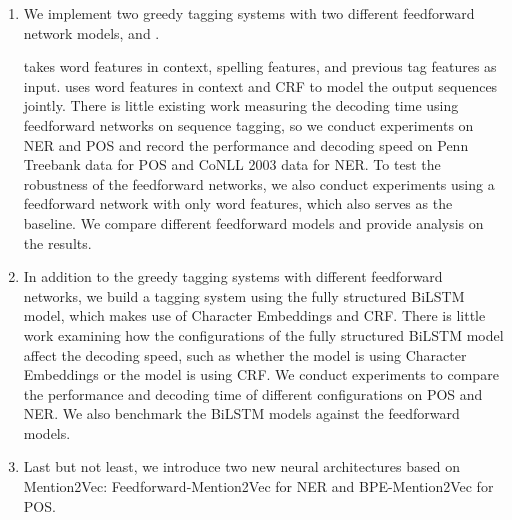 \begin{enumerate}

\item We implement two greedy tagging systems with two different feedforward network models, \ffa{} and \ffb. 

\ffa{} takes word features in context, spelling features, and previous tag features as input. \ffb{} uses word features in context and CRF to model the output sequences jointly. There is little existing work measuring the decoding time using feedforward networks on sequence tagging, so we conduct experiments on NER and POS and record the performance and decoding speed on Penn Treebank data for POS and CoNLL 2003 data for NER. To test the robustness of the feedforward networks, we also conduct experiments using a feedforward network with only word features, which also serves as the baseline. We compare different feedforward models and provide analysis on the results. 

\item In addition to the greedy tagging systems with different feedforward networks, we build a tagging system using the fully structured BiLSTM model, which makes use of Character Embeddings and CRF. There is little work examining how the configurations of the fully structured BiLSTM model affect the decoding speed, such as whether the model is using Character Embeddings or the model is using CRF. We conduct experiments to compare the performance and decoding time of different configurations on POS and NER. We also benchmark the BiLSTM models against the feedforward models.

\item Last but not least, we introduce two new neural architectures based on Mention2Vec: Feedforward-Mention2Vec for NER and BPE-Mention2Vec for POS. 


\end{enumerate}
